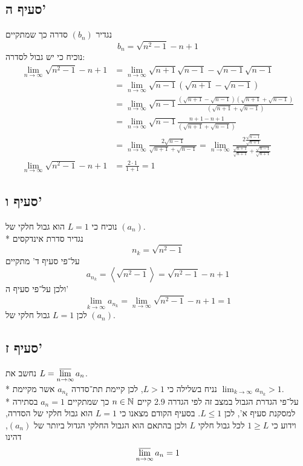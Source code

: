 \subsection{סעיף ה'}
נגדיר $(b_n)$ סדרה כך שמתקיים
\[
	b_n = \sqrt{n^2 - 1} - n + 1
\]
נוכיח כי יש גבול לסדרה:
\begin{align*}
	\lim_{n \to \infty} \sqrt{n^2 - 1} - n + 1
	& = \lim_{n \to \infty}\sqrt{n + 1} \sqrt{n - 1} - \sqrt{n - 1} \sqrt{n - 1} \\
	& = \lim_{n \to \infty}\sqrt{n - 1} \left( \sqrt{n + 1} - \sqrt{n - 1} \right) \\
	& = \lim_{n \to \infty}\sqrt{n - 1} \frac{\left( \sqrt{n + 1} - \sqrt{n - 1} \right)\left( \sqrt{n + 1} + \sqrt{n - 1} \right)}
		{\left( \sqrt{n + 1} + \sqrt{n - 1} \right)} \\
	& = \lim_{n \to \infty}\sqrt{n - 1} \frac{n + 1 - n + 1}{\left( \sqrt{n + 1} + \sqrt{n - 1} \right)} \\
	& = \lim_{n \to \infty}\frac{2 \sqrt{n - 1}}{ \sqrt{n + 1} + \sqrt{n - 1} }
	= \lim_{n \to \infty}\frac{2 \frac{\sqrt{n - 1}}{\sqrt{n + 1}}}{ \frac{\sqrt{n + 1}}{\sqrt{n + 1}} + \frac{\sqrt{n - 1}}{\sqrt{n + 1}} } \\
	\lim_{n \to \infty} \sqrt{n^2 - 1} - n + 1
	& = \frac{2 \cdot 1}{1 + 1} = 1
\end{align*}

\subsection{סעיף ו'}
נוכיח כי $L = 1$ הוא גבול חלקי של $(a_n)$. \\*
נגדיר סדרת אינדקסים
\[
	n_k = \sqrt{n^2 - 1}
\]
על־פי סעיף ד' מתקיים
\[
	a_{n_k} = \left\langle \sqrt{n^2 - 1} \right\rangle = \sqrt{n^2 - 1} - n + 1
\]
ולכן על־פי סעיף ה'
\[
	\lim_{k \to \infty} a_{n_k} = \lim_{n \to \infty} \sqrt{n^2 - 1} - n + 1 = 1
\]
לכן $L = 1$ גבול חלקי של $(a_n)$.

\subsection{סעיף ז'}
נחשב את $L = \displaystyle\operatorname*{\overline{lim}}_{n \to \infty} a_n$. \\*
נניח בשלילה כי $L > 1$, לכן קיימת תת־סדרה $a_{n_k}$ אשר מקיימת $\lim_{k \to \infty} a_{n_k} > 1$. \\*
על־פי הגדרת הגבול במצב זה לפי הגדרה 2.9 קיים $n \in \mathbb{N}$ כך שמתקיים $a_n = 1$ בסתירה למסקנת סעיף א', לכן $L \le 1$.
בסעיף הקודם מצאנו כי $L = 1$ הוא גבול חלקי של הסדרה, וידוע כי $1 \ge L$ לכל גבול חלקי $L$ ולכן בהתאם הוא הגבול החלקי הגדול ביותר של $(a_n)$, דהינו
\[
	\displaystyle\operatorname*{\overline{lim}}_{n \to \infty} a_n = 1
\]


